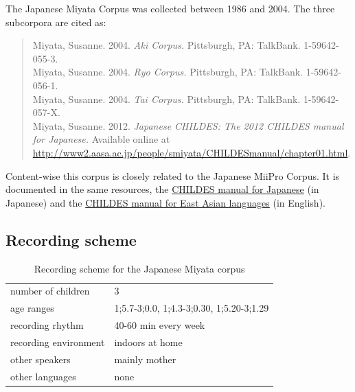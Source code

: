 \documentclass[a4paper, 11pt]{book}
\begin{document}
The Japanese Miyata Corpus \citep{Miyata2004a, Miyata2004b, Miyata2004c, Miyata2012a} was collected between 1986 and 2004. The three subcorpora are cited as:

\begin{quote}
	Miyata, Susanne. 2004. \emph{Aki Corpus.} Pittsburgh, PA: TalkBank. 1-59642-055-3. \\
	Miyata, Susanne. 2004. \emph{Ryo Corpus.} Pittsburgh, PA: TalkBank. 1-59642-056-1. \\
	Miyata, Susanne. 2004. \emph{Tai Corpus.} Pittsburgh, PA: TalkBank. 1-59642-057-X. \\
	Miyata, Susanne. 2012. \emph{Japanese CHILDES: The 2012 CHILDES manual for Japanese.} Available online at \url{http://www2.aasa.ac.jp/people/smiyata/CHILDESmanual/chapter01.html}.
\end{quote}

Content-wise this corpus is closely related to the Japanese MiiPro Corpus. It is documented in the same resources, the \href{http://www2.aasa.ac.jp/people/smiyata/CHILDESmanual/chapter01.html}{CHILDES manual for Japanese} (in Japanese) and the \href{http://childes.psy.cmu.edu/manuals/10eastasian.pdf}{CHILDES manual for East Asian languages} (in English). 


\subsection{Recording scheme}

\begin{table}[ht]
	\centering
	\begin{tabular}{ll}
		\toprule
		number of children 	& 3 \\
		age ranges 			& 1;5.7-3;0.0, 1;4.3-3;0.30, 1;5.20-3;1.29 \\
		recording rhythm 	& 40-60 min every week \\
		recording environment & indoors at home \\
		other speakers 		& mainly mother \\
		other languages		& none \\
		\bottomrule
	\end{tabular}
	\caption{Recording scheme for the Japanese Miyata corpus}
	\label{tab:Japanese Miyata recording scheme}
\end{table}
\end{document}
